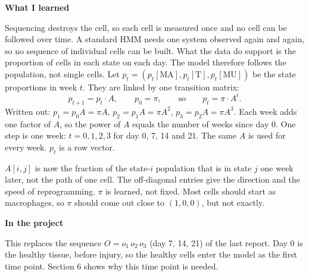 \documentclass[10pt,a4paper]{article}
\newcommand{\sub}[1]{\vspace{1pt}\textbf{\textcolor{gray!80!black}{#1}}\par}
\begin{document}
\sub{What I learned}
Sequencing destroys the cell, so each cell is measured once and no cell can be followed over time. A standard HMM needs one system observed again and again, so no sequence of individual cells can be built. What the data do support is the proportion of cells in each state on each day. The model therefore follows the population, not single cells. Let $p_t = (p_t[\mathrm{MA}], p_t[\mathrm{T}], p_t[\mathrm{MU}])$ be the state proportions in week $t$. They are linked by one transition matrix:
\[
p_{t+1} = p_t \cdot A, \qquad p_0 = \pi, \qquad \text{so} \qquad p_t = \pi \cdot A^t .
\]
Written out: $p_1 = p_0 A = \pi A$, $p_2 = p_1 A = \pi A^2$, $p_3 = p_2 A = \pi A^3$. Each week adds one factor of $A$, so the power of $A$ equals the number of weeks since day 0. One step is one week: $t = 0, 1, 2, 3$ for day 0, 7, 14 and 21. The same $A$ is used for every week. $p_t$ is a row vector.

$A[i,j]$ is now the fraction of the state-$i$ population that is in state $j$ one week later, not the path of one cell. The off-diagonal entries give the direction and the speed of reprogramming. $\pi$ is learned, not fixed. Most cells should start as macrophages, so $\pi$ should come out close to $(1,0,0)$, but not exactly.

\sub{In the project}
This replaces the sequence $O = o_1\, o_2\, o_3$ (day 7, 14, 21) of the last report. Day 0 is the healthy tissue, before injury, so the healthy cells enter the model as the first time point. Section 6 shows why this time point is needed.
\end{document}
